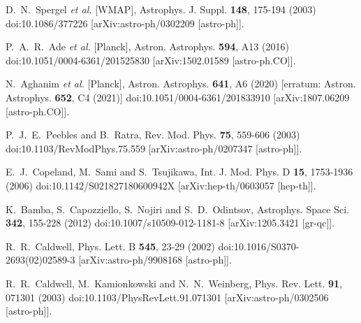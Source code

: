 \documentclass[a4paper,11pt]{article}
\begin{document}
\begin{thebibliography}{100}
D.~N.~Spergel \textit{et al.} [WMAP],
Astrophys. J. Suppl. \textbf{148}, 175-194 (2003)
doi:10.1086/377226
[arXiv:astro-ph/0302209 [astro-ph]].

P.~A.~R.~Ade \textit{et al.} [Planck],
Astron. Astrophys. \textbf{594}, A13 (2016)
doi:10.1051/0004-6361/201525830
[arXiv:1502.01589 [astro-ph.CO]].

N.~Aghanim \textit{et al.} [Planck],
Astron. Astrophys. \textbf{641}, A6 (2020)
[erratum: Astron. Astrophys. \textbf{652}, C4 (2021)]
doi:10.1051/0004-6361/201833910
[arXiv:1807.06209 [astro-ph.CO]].

P.~J.~E.~Peebles and B.~Ratra,
Rev. Mod. Phys. \textbf{75}, 559-606 (2003)
doi:10.1103/RevModPhys.75.559
[arXiv:astro-ph/0207347 [astro-ph]].

E.~J.~Copeland, M.~Sami and S.~Tsujikawa,
Int. J. Mod. Phys. D \textbf{15}, 1753-1936 (2006)
doi:10.1142/S021827180600942X
[arXiv:hep-th/0603057 [hep-th]].

K.~Bamba, S.~Capozziello, S.~Nojiri and S.~D.~Odintsov,
Astrophys. Space Sci. \textbf{342}, 155-228 (2012)
doi:10.1007/s10509-012-1181-8
[arXiv:1205.3421 [gr-qc]].

R.~R.~Caldwell,
Phys. Lett. B \textbf{545}, 23-29 (2002)
doi:10.1016/S0370-2693(02)02589-3
[arXiv:astro-ph/9908168 [astro-ph]].

R.~R.~Caldwell, M.~Kamionkowski and N.~N.~Weinberg,
Phys. Rev. Lett. \textbf{91}, 071301 (2003)
doi:10.1103/PhysRevLett.91.071301
[arXiv:astro-ph/0302506 [astro-ph]].


\end{thebibliography}
\end{document}
